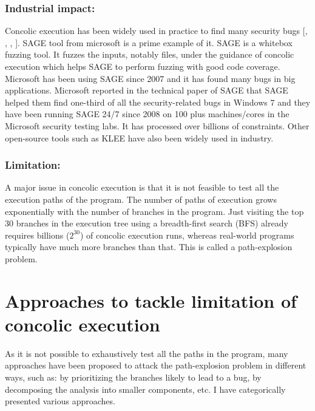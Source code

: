 \documentclass[ runningheads,
               a4paper]{llncs}
\begin{document}
\subsubsection{Industrial impact:}
Concolic execution has been widely used in practice to find many security bugs [\cite{godefroid2008automated}, \cite{kim2020hfl}, \cite{kim2022fuzzusb}, \cite{pham2016model}]. SAGE \cite{godefroid2012sage} tool from microsoft is a prime example of it. SAGE is a whitebox fuzzing tool. It fuzzes the inputs, notably files,
under the guidance of concolic execution which helps SAGE to perform fuzzing with good code coverage. Microsoft has been using SAGE since 2007 and it has found many bugs in big applications. Microsoft reported in the technical paper of SAGE \cite{godefroid2012sage} that SAGE helped them find one-third of all the security-related bugs in Windows 7 and they have been running SAGE 24/7 since 2008 on 100 plus machines/cores in the Microsoft security testing labs. It has processed over billions of constraints. Other open-source tools such as KLEE \cite{cadar2008klee} have also been widely used in industry.


\subsubsection{Limitation:}
A major issue in concolic execution is that it is not feasible to test all the execution paths of the program. The number of paths of execution grows exponentially with the number of branches in the program. Just visiting the top 30 branches in the execution tree using a breadth-first search (BFS) already requires billions (\(2^{30}\)) of concolic execution runs, whereas real-world programs typically have much more branches than that. This is called a path-explosion problem.






\section{Approaches to tackle limitation of concolic execution}
As it is not possible to exhaustively test all the paths in the program, many approaches have been proposed \cite{sabbaghi2020systematic} to attack the path-explosion problem in different ways, such as: by prioritizing the branches likely to lead to a bug, by decomposing the analysis into smaller components, etc. I have categorically presented various approaches.
\end{document}
